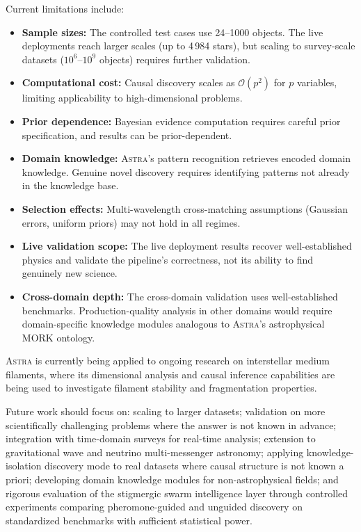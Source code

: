 \documentclass[usenatbib]{rasti}
\newcommand{\astra}{\textsc{Astra}\xspace}
\begin{document}
Current limitations include:
\begin{itemize}
  \item \textbf{Sample sizes:} The controlled test cases use 24--1000 objects. The live deployments reach larger scales (up to 4\,984 stars), but scaling to survey-scale datasets ($10^{6}$--$10^{9}$ objects) requires further validation.
  \item \textbf{Computational cost:} Causal discovery scales as $\mathcal{O}(p^2)$ for $p$ variables, limiting applicability to high-dimensional problems.
  \item \textbf{Prior dependence:} Bayesian evidence computation requires careful prior specification, and results can be prior-dependent.
  \item \textbf{Domain knowledge:} \astra's pattern recognition retrieves encoded domain knowledge. Genuine novel discovery requires identifying patterns not already in the knowledge base.
  \item \textbf{Selection effects:} Multi-wavelength cross-matching assumptions (Gaussian errors, uniform priors) may not hold in all regimes.
  \item \textbf{Live validation scope:} The live deployment results recover well-established physics and validate the pipeline's correctness, not its ability to find genuinely new science.
  \item \textbf{Cross-domain depth:} The cross-domain validation uses well-established benchmarks. Production-quality analysis in other domains would require domain-specific knowledge modules analogous to \astra's astrophysical MORK ontology.
\end{itemize}

\astra is currently being applied to ongoing research on interstellar medium filaments, where its dimensional analysis and causal inference capabilities are being used to investigate filament stability and fragmentation properties.

Future work should focus on: scaling to larger datasets; validation on more scientifically challenging problems where the answer is not known in advance; integration with time-domain surveys for real-time analysis; extension to gravitational wave and neutrino multi-messenger astronomy; applying knowledge-isolation discovery mode to real datasets where causal structure is not known a priori; developing domain knowledge modules for non-astrophysical fields; and rigorous evaluation of the stigmergic swarm intelligence layer through controlled experiments comparing pheromone-guided and unguided discovery on standardized benchmarks with sufficient statistical power.
\end{document}
